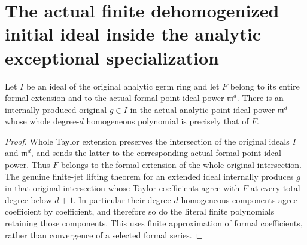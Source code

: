 \section{The actual finite dehomogenized initial ideal inside the analytic exceptional specialization}

\begin{theorem}
\label{hir:actual-point-original-initial-polynomial-lift}
\leanok
Let $I$ be an ideal of the original analytic germ ring and let $F$ belong
to its entire formal extension and to the actual formal point ideal power
$\mathfrak m^d$. There is an internally produced original $g\in I$
in the actual analytic point ideal power $\mathfrak m^d$ whose whole
degree-$d$ homogeneous polynomial is precisely that of $F$.
\end{theorem}
\begin{proof}
Whole Taylor extension preserves the intersection of the original ideals
$I$ and $\mathfrak m^d$, and sends the latter to the corresponding actual
formal point ideal power. Thus $F$ belongs to the formal extension of the
whole original intersection. The genuine finite-jet lifting theorem for
an extended ideal internally produces $g$ in that original intersection
whose Taylor coefficients agree with $F$ at every total degree below
$d+1$. In particular their degree-$d$ homogeneous components agree
coefficient by coefficient, and therefore so do the literal finite
polynomials retaining those components. This uses finite approximation of
formal coefficients, rather than convergence of a selected formal series.
\end{proof}

